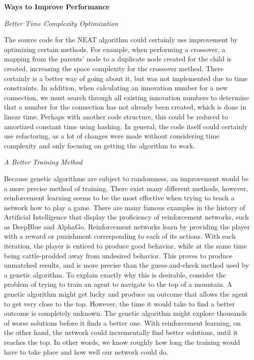 \documentclass[12pt]{article}
\begin{document}
\begin{flushleft}
\hfill

\noindent\textbf{Ways to Improve Performance}

\noindent\emph{Better Time Complexity Optimization}

The source code for the NEAT algorithm could certainly use improvement by optimizing certain methods. For example, when performing a crossover, a mapping from the parents' node to a duplicate node created for the child is created, increasing the space complexity for the crossover method. There certainly is a better way of going about it, but was not implemented due to time constraints. In addition, when calculating an innovation number for a new connection, we must search through all existing innovation numbers to determine that a number for the connection has not already been created, which is done in linear time. Perhaps with another code structure, this could be reduced to amortized constant time using hashing. In general, the code itself could certainly use refactoring, as a lot of changes were made without considering time complexity and only focusing on getting the algorithm to work.


\hfill

\noindent\emph{A Better Training Method}

Because genetic algorithms are subject to randomness, an improvement would be a more precise method of training. There exist many different methods, however, reinforcement learning seems to be the most effective when trying to teach a network how to play a game. There are many famous examples in the history of Artificial Intelligence that display the proficiency of reinforcement networks, such as DeepBlue and AlphaGo. 
Reinforcement networks learn by providing the player with a reward or punishment corresponding to each of its actions. With each iteration, the player is enticed to produce good behavior, while at the same time being cattle-prodded away from undesired behavior. This proves to produce unmatched results, and is more precise than the guess-and-check method used by a genetic algorithm. To explain exactly why this is desirable, consider the problem of trying to train an agent to navigate to the top of a mountain. A genetic algorithm might get lucky and produce an outcome that allows the agent to get very close to the top. However, the time it would take to find a better outcome is completely unknown. The genetic algorithm might explore thousands of worse solutions before it finds a better one. With reinforcement learning, on the other hand, the network could incrementally find better solutions, until it reaches the top. In other words, we know roughly how long the training would have to take place and how well our network could do. 


\end{flushleft}
\end{document}
